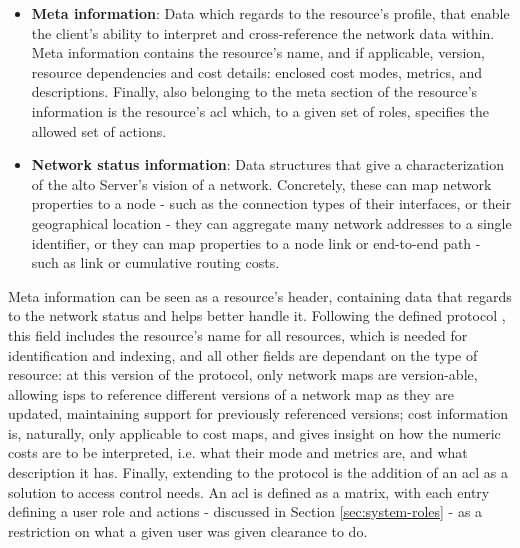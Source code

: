\begin{itemize}
        \item \textbf{Meta information}: Data which regards to the resource's profile, that enable the client's ability to interpret and cross-reference the network data within.
            Meta information contains the resource's name, and if applicable, version, resource dependencies and cost details: enclosed cost modes, metrics, and descriptions.
            Finally, also belonging to the meta section of the resource's information is the resource's \gls{acl} which, to a given set of roles, specifies the allowed set of actions.

        \item \textbf{Network status information}: Data structures that give a characterization of the \gls{alto} Server's vision of a network.
            Concretely, these can map network properties to a node - such as the connection types of their interfaces, or their geographical location - they can aggregate many network addresses to a single identifier, or they can map properties to a node link or end-to-end path - such as link or cumulative routing costs.
\end{itemize}

    Meta information can be seen as a resource's header, containing data that regards to the network status and helps better handle it.
    Following the defined protocol \cite{alto-protocol}, this field includes the resource's name for all resources, which is needed for identification and indexing, and all other fields are dependant on the type of resource: at this version of the protocol, only network maps are version-able, allowing \glspl{isp} to reference different versions of a network map as they are updated, maintaining support for previously referenced versions; cost information is, naturally, only applicable to cost maps, and gives insight on how the numeric costs are to be interpreted, i.e. what their mode and metrics are, and what description it has.
    Finally, extending to the protocol is the addition of an \gls{acl} as a solution to access control needs.
    An \gls{acl} is defined as a matrix, with each entry defining a user role and actions - discussed in Section \ref{sec:system-roles} - as a restriction on what a given user was given clearance to do.

